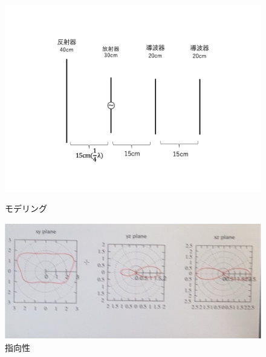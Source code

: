 \documentclass[dvipdfmx,autodetect-engine,titlepage]{jsarticle}
\begin{document}
\begin{figure}[h]
  \centering
  \begin{minipage}[b]{0.45\linewidth}
  \begin{center}
    \includegraphics[keepaspectratio,scale=0.4]{pic4.png}
    \end{center}
    \caption{モデリング}
  \end{minipage}
  \begin{minipage}[b]{0.45\linewidth}
  \begin{center}
    \includegraphics[keepaspectratio,scale=0.5]{pic10.png}
    \end{center}
    \caption{指向性}
  \end{minipage}
\end{figure}
\end{document}
